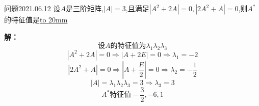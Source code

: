 \begin{mybox}{问题2021.06.12}
	\qquad 设$A$是三阶矩阵,$\left|A\right|=3$,且满足$\left|A^2+2A\right|=0,\left|2A^2+A\right|=0$,则$A^{*}$的特征值是\underline{\hbox to 20mm{}}
\end{mybox}	
\noindent
\textbf{解：}
$$\text{设}A\text{的特征值为}\lambda_{1}\lambda_{2}\lambda_{3}$$
$$\left|A^2+2A\right|=0\Rightarrow \left|A+2E\right|=0\Rightarrow \lambda_{1}=-2$$
$$\left|2A^2+A\right|=0\Rightarrow \left|A+\frac{E}{2}\right|=0\Rightarrow \lambda_{2}=-\frac{1}{2}$$
$$\left|A\right|=\lambda_{1}\lambda_{2}\lambda_{3}=3 \Rightarrow \lambda_{3}=3$$
$$A^{*}\text{特征值} -\frac{3}{2},-6,1$$